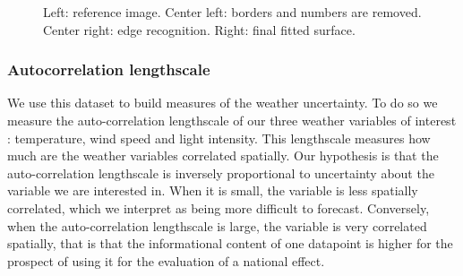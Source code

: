 \begin{figure}[!ht]
\begin{center} 
 \end{center}
\caption{\small Left: reference image. Center left: borders and numbers are removed. Center right: edge recognition. Right: final fitted surface. }
\label{fig:mciel}
\end{figure}

\subsubsection{Autocorrelation lengthscale}
\label{autocorr}
We use this dataset to build measures of the weather uncertainty. To do so we measure the auto-correlation lengthscale of our three weather variables of interest : temperature, wind speed and light intensity. This lengthscale measures how much are the weather variables correlated spatially. Our hypothesis is that the auto-correlation lengthscale is inversely proportional to uncertainty about the variable we are interested in. When it is small, the variable is less spatially correlated, which we interpret as being more difficult to forecast. Conversely, when the auto-correlation lengthscale is large, the variable is very correlated spatially, that is that the informational content of one datapoint is higher for the prospect of using it for the evaluation of a national effect.\\

